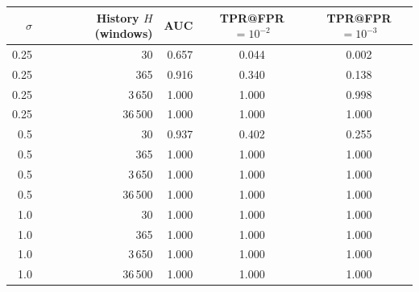 \begin{tabular}{rrrcc}
\toprule
$\sigma$ & History $H$ (windows) & AUC & TPR@FPR$=10^{-2}$ & TPR@FPR$=10^{-3}$\\
\midrule
0.25 & 30 & 0.657 & 0.044 & 0.002\\
0.25 & 365 & 0.916 & 0.340 & 0.138\\
0.25 & 3\,650 & 1.000 & 1.000 & 0.998\\
0.25 & 36\,500 & 1.000 & 1.000 & 1.000\\
0.5 & 30 & 0.937 & 0.402 & 0.255\\
0.5 & 365 & 1.000 & 1.000 & 1.000\\
0.5 & 3\,650 & 1.000 & 1.000 & 1.000\\
0.5 & 36\,500 & 1.000 & 1.000 & 1.000\\
1.0 & 30 & 1.000 & 1.000 & 1.000\\
1.0 & 365 & 1.000 & 1.000 & 1.000\\
1.0 & 3\,650 & 1.000 & 1.000 & 1.000\\
1.0 & 36\,500 & 1.000 & 1.000 & 1.000\\
\bottomrule
\end{tabular}
